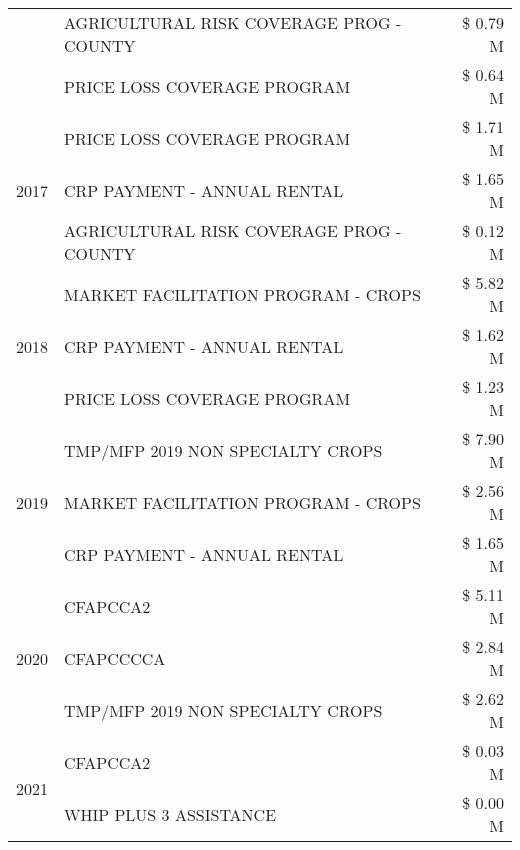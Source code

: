 \begin{tabular}{llr}
 & AGRICULTURAL RISK COVERAGE PROG - COUNTY & \$ 0.79 M \\
 & PRICE LOSS COVERAGE PROGRAM & \$ 0.64 M \\
\cline{1-3}
\multirow[t]{3}{*}{2017} & PRICE LOSS COVERAGE PROGRAM & \$ 1.71 M \\
 & CRP PAYMENT - ANNUAL RENTAL & \$ 1.65 M \\
 & AGRICULTURAL RISK COVERAGE PROG - COUNTY & \$ 0.12 M \\
\cline{1-3}
\multirow[t]{3}{*}{2018} & MARKET FACILITATION PROGRAM - CROPS & \$ 5.82 M \\
 & CRP PAYMENT - ANNUAL RENTAL & \$ 1.62 M \\
 & PRICE LOSS COVERAGE PROGRAM & \$ 1.23 M \\
\cline{1-3}
\multirow[t]{3}{*}{2019} & TMP/MFP 2019 NON SPECIALTY CROPS & \$ 7.90 M \\
 & MARKET FACILITATION PROGRAM - CROPS & \$ 2.56 M \\
 & CRP PAYMENT - ANNUAL RENTAL & \$ 1.65 M \\
\cline{1-3}
\multirow[t]{3}{*}{2020} & CFAPCCA2 & \$ 5.11 M \\
 & CFAPCCCCA & \$ 2.84 M \\
 & TMP/MFP 2019 NON SPECIALTY CROPS & \$ 2.62 M \\
\cline{1-3}
\multirow[t]{2}{*}{2021} & CFAPCCA2 & \$ 0.03 M \\
 & WHIP PLUS 3 ASSISTANCE & \$ 0.00 M \\
\cline{1-3}
\bottomrule
\end{tabular}
